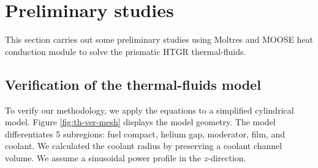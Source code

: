 \section{Preliminary studies}

This section carries out some preliminary studies using Moltres and MOOSE heat conduction module to solve the prismatic HTGR thermal-fluids.

\subsection{Verification of the thermal-fluids model}

To verify our methodology, we apply the equations to a simplified cylindrical model.
Figure \ref{fig:th-ver-mesh} displays the model geometry.
The model differentiates 5 subregions: fuel compact, helium gap, moderator, film, and coolant.
We calculated the coolant radius by preserving a coolant channel volume.
We assume a sinusoidal power profile in the $z$-direction.

